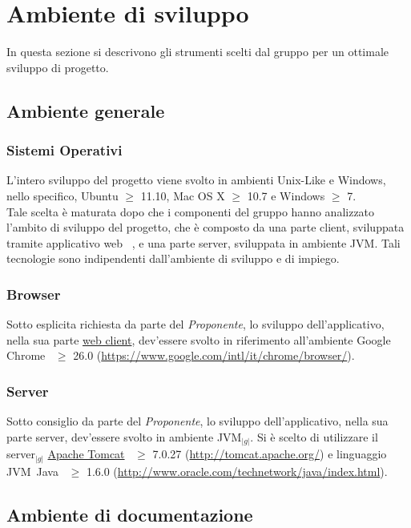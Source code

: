 \section{Ambiente di sviluppo}{
	In questa sezione si descrivono gli strumenti scelti dal gruppo \textit{\ggt} per un ottimale sviluppo di progetto.

	\subsection{Ambiente generale} {
		\subsubsection{Sistemi Operativi}{
			L'intero sviluppo del progetto viene svolto in ambienti Unix-Like e Windows, nello specifico, Ubuntu $\geqslant$  11.10, Mac OS X $\geqslant$  10.7 e Windows $\geqslant$ 7.\\
			Tale scelta è maturata dopo che i componenti del gruppo hanno analizzato l'ambito di sviluppo del progetto, che è composto da una parte client\g , sviluppata tramite applicativo web\g~ , e una parte server\g , sviluppata in ambiente JVM\g . Tali tecnologie sono indipendenti dall'ambiente di sviluppo e di impiego.
		}
		\subsubsection{Browser}{
			Sotto esplicita richiesta da parte del \textit{Proponente}, lo sviluppo dell'applicativo, nella sua parte \underline{web client}\g , dev'essere svolto in riferimento all'ambiente Google Chrome\g~ $\geqslant$ 26.0 (\url{https://www.google.com/intl/it/chrome/browser/}).
		}

		\subsubsection{Server}{
			Sotto consiglio da parte del \textit{Proponente}, lo sviluppo dell'applicativo, nella sua parte server\g , dev'essere svolto in ambiente JVM$_{|g|}$. Si è scelto di utilizzare il server$_{|g|}$ \underline{Apache Tomcat}\g~ $\geqslant$ 7.0.27 (\url{http://tomcat.apache.org/}) e linguaggio JVM\g \ Java\g~ $\geqslant$ 1.6.0 (\url{http://www.oracle.com/technetwork/java/index.html}).
		}
	}

	\subsection{Ambiente di documentazione} {
}}

